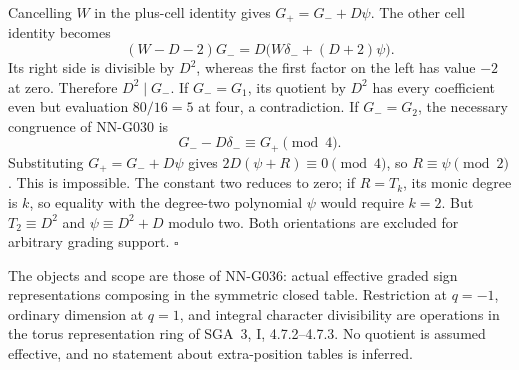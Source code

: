 Cancelling $W$ in the plus-cell identity gives
$G_+=G_-+D\psi$. The other cell identity becomes
\[
 (W-D-2)G_-=D\bigl(W\delta_-+(D+2)\psi\bigr).
\]
Its right side is divisible by $D^2$, whereas the first factor
on the left has value $-2$ at zero. Therefore $D^2\mid G_-$.
If $G_-=G_1$, its quotient by $D^2$ has every coefficient even
but evaluation $80/16=5$ at four, a contradiction.
If $G_-=G_2$, the necessary congruence of NN-G030 is
\[
 G_--D\delta_-\equiv G_+\pmod4.
\]
Substituting $G_+=G_-+D\psi$ gives
$2D(\psi+R)\equiv0\pmod4$, so $R\equiv\psi\pmod2$.
This is impossible. The constant two reduces to zero; if
$R=T_k$, its monic degree is $k$, so equality with the degree-two
polynomial $\psi$ would require $k=2$. But
$T_2\equiv D^2$ and $\psi\equiv D^2+D$ modulo two.
Both orientations are excluded for arbitrary grading support.
\hfill$\square$

The objects and scope are those of NN-G036: actual effective graded
sign representations composing in the symmetric closed table.
Restriction at $q=-1$, ordinary dimension at $q=1$, and integral
character divisibility are operations in the torus representation
ring of SGA~3, I, 4.7.2--4.7.3. No quotient is assumed effective,
and no statement about extra-position tables is inferred.
